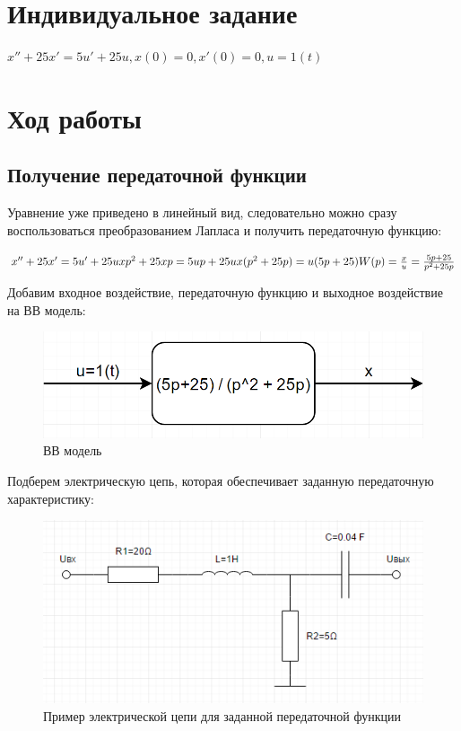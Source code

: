 \documentclass[14pt,a4paper,report]{report}
\begin{document}
\section{Индивидуальное задание}

$x''+25x'=5u'+25u, x(0)=0, x'(0)=0, u=1(t)$

\section{Ход работы}

\subsection{Получение передаточной функции}

Уравнение уже приведено в линейный вид, следовательно можно сразу воспользоваться преобразованием Лапласа и получить передаточную функцию:

$
\\
x''+25x'=5u'+25u\\
xp^2+25xp=5up+25u \\
x(p^2+25p)=u(5p+25) \\
W(p)=\frac{x}{u}=\frac{5p+25}{p^2+25p}\\
$

Добавим входное воздействие, передаточную функцию и выходное воздействие на ВВ модель:

\begin{figure}[h!]
	\centering
	\includegraphics[scale = 0.55]{images/ou.png}
	\caption{ВВ модель}
	\label{image:1}
\end{figure}

\clearpage

Подберем электрическую цепь, которая обеспечивает заданную передаточную характеристику:

\begin{figure}[h!]
	\centering
	\includegraphics[scale = 0.79]{images/schema.png}
	\caption{Пример электрической цепи для заданной передаточной функции}
	\label{image:2}
\end{figure}
\end{document}
